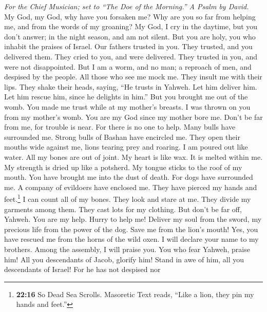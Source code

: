\emph{For the Chief Musician; set to ``The Doe of the Morning.'' A Psalm
by David.}\\
 My God, my God, why have you forsaken me? Why are you so
far from helping me, and from the words of my groaning? 
My God, I cry in the daytime, but you don't answer; in the night season,
and am not silent.  But you are holy, you who inhabit the
praises of Israel.  Our fathers trusted in you. They
trusted, and you delivered them.  They cried to you, and
were delivered. They trusted in you, and were not disappointed.
 But I am a worm, and no man; a reproach of men, and
despised by the people.  All those who see me mock me.
They insult me with their lips. They shake their heads, saying,
 ``He trusts in Yahweh. Let him deliver him. Let him
rescue him, since he delights in him.''  But you brought
me out of the womb. You made me trust while at my mother's breasts.
 I was thrown on you from my mother's womb. You are my
God since my mother bore me.  Don't be far from me, for
trouble is near. For there is no one to help.  Many bulls
have surrounded me. Strong bulls of Bashan have encircled me.
 They open their mouths wide against me, lions tearing
prey and roaring.  I am poured out like water. All my
bones are out of joint. My heart is like wax. It is melted within me.
 My strength is dried up like a potsherd. My tongue
sticks to the roof of my mouth. You have brought me into the dust of
death.  For dogs have surrounded me. A company of
evildoers have enclosed me. They have pierced my hands and
feet.\footnote{\textbf{22:16} So Dead Sea Scrolls. Masoretic Text reads,
  ``Like a lion, they pin my hands and feet.''}  I can
count all of my bones. They look and stare at me.  They
divide my garments among them. They cast lots for my clothing.
 But don't be far off, Yahweh. You are my help. Hurry to
help me!  Deliver my soul from the sword, my precious
life from the power of the dog.  Save me from the lion's
mouth! Yes, you have rescued me from the horns of the wild oxen.
 I will declare your name to my brothers. Among the
assembly, I will praise you.  You who fear Yahweh, praise
him! All you descendants of Jacob, glorify him! Stand in awe of him, all
you descendants of Israel!  For he has not despised nor

